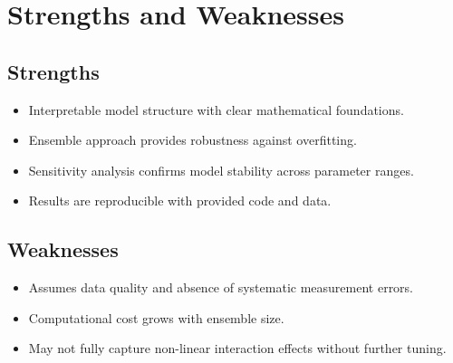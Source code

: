 \section{Strengths and Weaknesses}

\subsection{Strengths}
\begin{itemize}
  \item Interpretable model structure with clear mathematical foundations.
  \item Ensemble approach provides robustness against overfitting.
  \item Sensitivity analysis confirms model stability across parameter ranges.
  \item Results are reproducible with provided code and data.
\end{itemize}

\subsection{Weaknesses}
\begin{itemize}
  \item Assumes data quality and absence of systematic measurement errors.
  \item Computational cost grows with ensemble size.
  \item May not fully capture non-linear interaction effects without further tuning.
\end{itemize}
